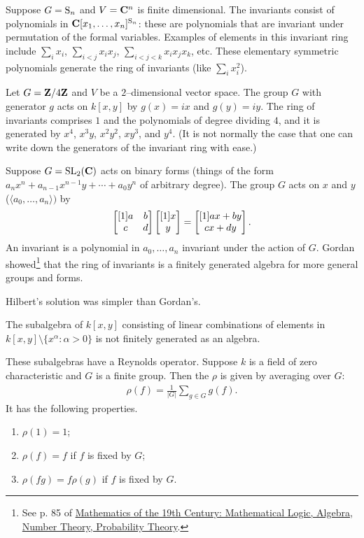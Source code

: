\documentclass[11pt, oneside,margin=1in]{article}
\begin{document}
\begin{example}[ ]\label{}
Suppose $G=\operatorname{S}_n$ and $V=\mathbf C^n$ is finite dimensional. The invariants consist of polynomials in $\mathbf C[x_1,\hdots,x_n]^{\operatorname{S}_n}$: these are polynomials that are invariant under permutation of the formal variables. Examples of elements in this invariant ring include $\sum_i x_i$, $\sum_{i<j} x_ix_j$, $\sum_{i<j<k} x_ix_jx_k$, etc. These elementary symmetric polynomials generate the ring of invariants (like $\sum_i x_i^2$).
\end{example}

\begin{example}[ ]\label{}
Let $G= \mathbf Z / 4\mathbf Z$ and $V$ be a $2$--dimensional vector space. The group $G$ with generator $g$ acts on $k[x,y]$ by $g(x) = ix$ and $g(y)=iy$. The ring of invariants comprises $1$ and the polynomials of degree dividing $4$, and it is generated by $x^4$, $x^3y$, $x^2y^2$, $xy^3$, and $y^4$. (It is not normally the case that one can write down the generators of the invariant ring with ease.) 
\end{example}

\begin{example}[ ]\label{}
Suppose $G=\operatorname{SL}_{2}(\mathbf{C})$ acts on binary forms (things of the form $a_nx^n + a_{n-1}x^{n-1} y + \cdots + a_0y^n$ of arbitrary degree). The group $G$ acts on $x$ and $y$ ($\langle a_0,\hdots, a_n  \rangle)$ by 
 \begin{align*}
	 \begin{bmatrix} [1] a & b\\ c& d\end{bmatrix} \begin{bmatrix} [1] x\\y\end{bmatrix} = \begin{bmatrix} [1] ax+by\\cx+dy\end{bmatrix}. 
\end{align*}
An invariant is a polynomial in $a_0,\hdots, a_n$ invariant under the action of $G$. Gordan showed\footnote{See p. 85 of \underline{Mathematics of the 19th Century: Mathematical Logic, Algebra, Number Theory, Probability Theory}.} that the ring of invariants is a finitely generated algebra for more general groups and forms. 
\end{example}

Hilbert's solution was simpler than Gordan's.
\begin{example}\label{}
The subalgebra of $k[x,y]$ consisting of linear combinations of elements in $k[x,y]\setminus \{x^\alpha : \alpha > 0\}$ is not finitely generated as an algebra. 
\end{example}

These subalgebras have a {Reynolds operator}. Suppose $k$ is a field of zero characteristic and $G$ is a finite group. Then the  $\rho$ is given by averaging over $G$:
\begin{align*}
	\rho (f) = \frac{1}{\left\lvert G \right\rvert }\sum_{g\in G} g(f).
\end{align*}
It has the following properties.
\begin{enumerate}
	\item $\rho(1) =1$;
	\item $\rho(f) = f$ if $f$ is fixed by $G$;
	\item $\rho(fg) = f\rho (g)$ if $f$ is fixed by $G$.
\end{enumerate}
\end{document}
